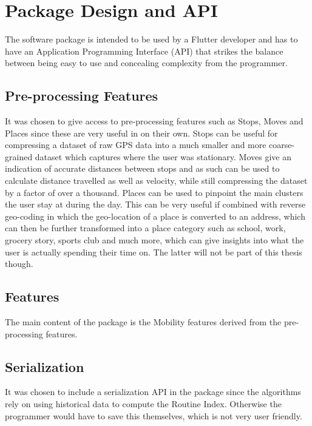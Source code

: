 \section{Package Design and API}
The software package is intended to be used by a Flutter developer and has to have an Application Programming Interface (API) that strikes the balance between being easy to use and concealing complexity from the programmer.

\subsection{Pre-processing Features}
It was chosen to give access to pre-processing features such as Stops, Moves and Places since these are very useful in on their own. Stops can be useful for compressing a dataset of raw GPS data into a much smaller and more coarse-grained dataset which captures where the user was stationary. Moves give an indication of accurate distances between stops and as such can be used to calculate distance travelled as well as velocity, while still compressing the dataset by a factor of over a thousand. Places can be used to pinpoint the main clusters the user stay at during the day. This can be very useful if combined with reverse geo-coding in which the geo-location of a place is converted to an address, which can then be further transformed into a place category such as school, work, grocery story, sports club and much more, which can give insights into what the user is actually spending their time on. The latter will not be part of this thesis though.

\subsection{Features}
The main content of the package is the Mobility features derived from the pre-processing features. 

\subsection{Serialization}
It was chosen to include a serialization API in the package since the algorithms rely on using historical data to compute the Routine Index. Otherwise the programmer would have to save this themselves, which is not very user friendly.

